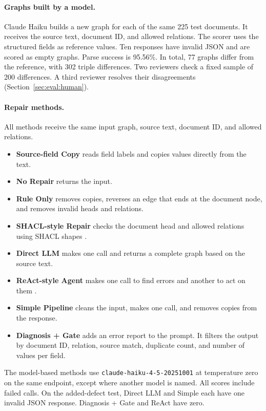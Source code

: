 \paragraph{Graphs built by a model.}
Claude Haiku builds a new graph for each of the same 225 test documents.
It receives the source text, document ID, and allowed relations.
The scorer uses the structured fields as reference values. Ten responses
have invalid JSON and are scored as empty graphs. Parse success is 95.56\%.
In total, 77 graphs differ from the reference, with 302 triple differences.
Two reviewers check a fixed sample of 200 differences. A third reviewer
resolves their disagreements (Section~\ref{sec:eval:human}).

\paragraph{Repair methods.}
All methods receive the same input graph, source text, document ID, and
allowed relations.
\begin{itemize}
    \item \textbf{Source-field Copy} reads field labels and copies values
    directly from the text.
    \item \textbf{No Repair} returns the input.
    \item \textbf{Rule Only} removes copies, reverses an edge that ends at
    the document node, and removes invalid heads and relations.
    \item \textbf{SHACL-style Repair} checks the document head and allowed
    relations using SHACL shapes \citep{ref_shacl2017}.
    \item \textbf{Direct LLM} makes one call and returns a complete graph
    based on the source text.
    \item \textbf{ReAct-style Agent} makes one call to find errors and
    another to act on them \citep{ref_yao2023react}.
    \item \textbf{Simple Pipeline} cleans the input, makes one call,
    and removes copies from the response.
    \item \textbf{Diagnosis + Gate} adds an error report to the prompt.
    It filters the output by document ID, relation, source match, duplicate
    count, and number of values per field.
\end{itemize}

The model-based methods use \texttt{claude-haiku-4-5-20251001}
\citep{ref_anthropic_claude45} at temperature zero on the same endpoint,
except where another model is named. All scores include failed calls.
On the added-defect test, Direct LLM and Simple each have one invalid JSON
response. Diagnosis + Gate and ReAct have zero.

